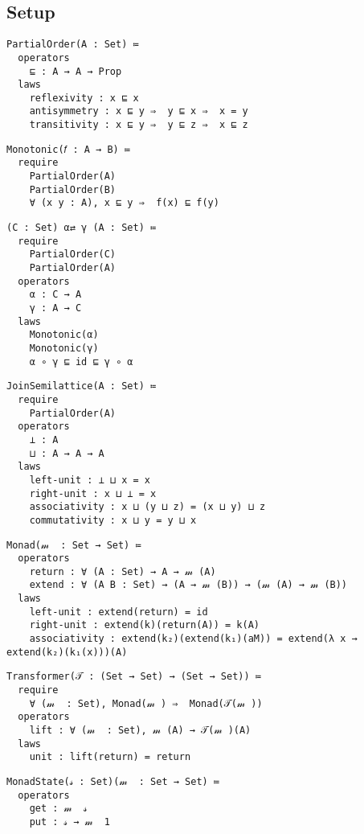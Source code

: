 \documentclass{article}
\begin{document}

\subsection{Setup}
\label{section:Proofs+Definitions:Setup}

\begin{verbatim}
PartialOrder(A : Set) ≔
  operators
    ⊑ : A → A → Prop
  laws
    reflexivity : x ⊑ x
    antisymmetry : x ⊑ y ⇒  y ⊑ x ⇒  x = y
    transitivity : x ⊑ y ⇒  y ⊑ z ⇒  x ⊑ z
\end{verbatim}

\begin{verbatim}
Monotonic(𝑓 : A → B) ≔ 
  require
    PartialOrder(A)
    PartialOrder(B)
    ∀ (x y : A), x ⊑ y ⇒  f(x) ⊑ f(y)
\end{verbatim}

\begin{verbatim}
(C : Set) α⇄ γ (A : Set) ≔
  require
    PartialOrder(C)
    PartialOrder(A)
  operators
    α : C → A
    γ : A → C
  laws
    Monotonic(α)
    Monotonic(γ)
    α ∘ γ ⊑ id ⊑ γ ∘ α
\end{verbatim}

\begin{verbatim}
JoinSemilattice(A : Set) ≔
  require
    PartialOrder(A)
  operators
    ⊥ : A
    ⊔ : A → A → A
  laws
    left-unit : ⊥ ⊔ x = x
    right-unit : x ⊔ ⊥ = x
    associativity : x ⊔ (y ⊔ z) = (x ⊔ y) ⊔ z
    commutativity : x ⊔ y = y ⊔ x
\end{verbatim}

\begin{verbatim}
Monad(𝓂  : Set → Set) ≔
  operators
    return : ∀ (A : Set) → A → 𝓂 (A)
    extend : ∀ (A B : Set) → (A → 𝓂 (B)) → (𝓂 (A) → 𝓂 (B))
  laws
    left-unit : extend(return) = id
    right-unit : extend(k)(return(A)) = k(A)
    associativity : extend(k₂)(extend(k₁)(aM)) = extend(λ x → extend(k₂)(k₁(x)))(A)
\end{verbatim}

\begin{verbatim}
Transformer(𝒯 : (Set → Set) → (Set → Set)) ≔
  require
    ∀ (𝓂  : Set), Monad(𝓂 ) ⇒  Monad(𝒯(𝓂 ))
  operators
    lift : ∀ (𝓂  : Set), 𝓂 (A) → 𝒯(𝓂 )(A)
  laws
    unit : lift(return) = return
\end{verbatim}

\begin{verbatim}
MonadState(𝓈 : Set)(𝓂  : Set → Set) ≔
  operators
    get : 𝓂  𝓈
    put : 𝓈 → 𝓂  1
\end{verbatim}
\end{document}
